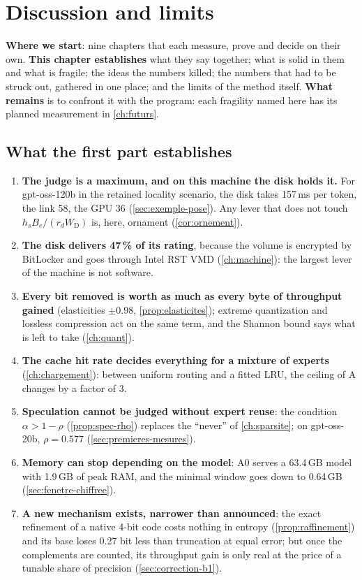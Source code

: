 \chapter{Discussion and limits}\label{ch:discussion}

\begin{origine}
\textbf{Where we start}: nine chapters that each measure, prove and decide on their own.
\textbf{This chapter establishes} what they say together; what is solid in them and what is fragile; the ideas the numbers killed; the numbers that had to be struck out, gathered in one place; and the limits of the method itself.
\textbf{What remains} is to confront it with the program: each fragility named here has its planned measurement in \cref{ch:futurs}.
\end{origine}

\section{What the first part establishes}\label{sec:bilan}

\begin{enumerate}
\item \textbf{The judge is a maximum, and on this machine the disk holds it.} For gpt-oss-120b in the retained locality scenario, the disk takes 157\,ms per token, the link 58, the GPU 36 (\cref{sec:exemple-pose}). Any lever that does not touch $h_s B_e/(r_d W_{\mathrm{D}})$ is, here, ornament (\cref{cor:ornement}).
\item \textbf{The disk delivers 47\,\% of its rating}, because the volume is encrypted by BitLocker and goes through Intel RST VMD (\cref{ch:machine}): the largest lever of the machine is not software.
\item \textbf{Every bit removed is worth as much as every byte of throughput gained} (elasticities $\pm 0.98$, \cref{prop:elasticites}); extreme quantization and lossless compression act on the same term, and the Shannon bound says what is left to take (\cref{ch:quant}).
\item \textbf{The cache hit rate decides everything for a mixture of experts} (\cref{ch:chargement}): between uniform routing and a fitted LRU, the ceiling of A changes by a factor of 3.
\item \textbf{Speculation cannot be judged without expert reuse}: the condition $\alpha > 1 - \rho$ (\cref{prop:spec-rho}) replaces the ``never'' of \cref{ch:sparsite}; on gpt-oss-20b, $\rho = 0.577$ (\cref{sec:premieres-mesures}).
\item \textbf{Memory can stop depending on the model}: A0 serves a 63.4\,GB model with 1.9\,GB of peak RAM, and the minimal window goes down to 0.64\,GB (\cref{sec:fenetre-chiffree}).
\item \textbf{A new mechanism exists, narrower than announced}: the exact refinement of a native 4-bit code costs nothing in entropy (\cref{prop:raffinement}) and its base loses 0.27 bit less than truncation at equal error; but once the complements are counted, its throughput gain is only real at the price of a tunable share of precision (\cref{sec:correction-b1}).
\end{enumerate}

